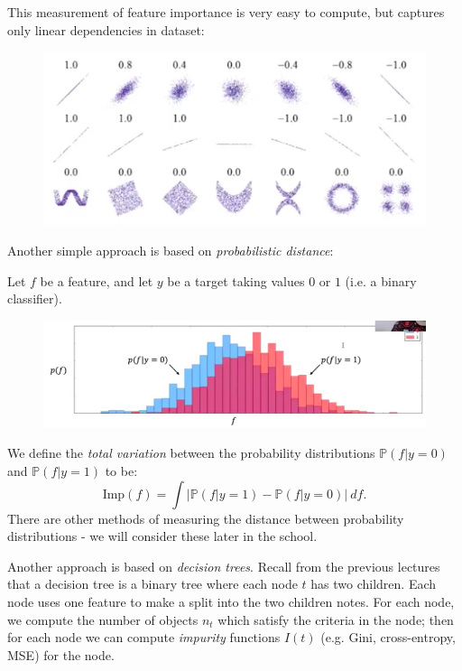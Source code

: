 This measurement of feature importance is very easy to compute, but captures only linear dependencies in dataset:

\begin{figure}[H]
\centering
\includegraphics[scale=0.3]{correlationcoefficient.png}
\end{figure}

Another simple approach is based on \textit{probabilistic distance}:
\begin{framedef}
Let $f$ be a feature, and let $y$ be a target taking values $0$ or $1$ (i.e. a binary classifier).

\begin{figure}[H]
\centering
\includegraphics[scale=0.3]{featureprobabilities.png}
\end{figure}

We define the \textit{total variation} between the probability distributions $\mathbb{P}(f | y=0)$ and $\mathbb{P}(f | y = 1)$ to be:
\begin{equation*}
\textrm{Imp}(f) = \int \left| \mathbb{P}(f | y = 1) - \mathbb{P}(f | y =0) \right|\ df.
\end{equation*}
There are other methods of measuring the distance between probability distributions - we will consider these later in the school. 
\end{framedef}



\newpage
Another approach is based on \textit{decision trees}. Recall from the previous lectures that a decision tree is a binary tree where each node $t$ has two children. Each node uses one feature to make a split into the two children notes. For each node, we compute the number of objects $n_t$ which satisfy the criteria in the node; then for each node we can compute \textit{impurity} functions $I(t)$ (e.g. Gini, cross-entropy, MSE) for the node. 

